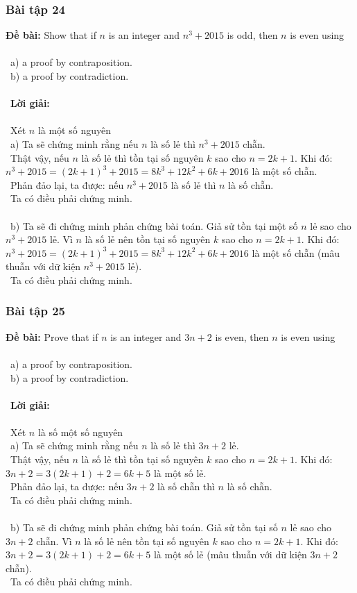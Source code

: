 \documentclass[a4paper]{article}
\begin{document}
\clearpage
\subsubsection{Bài tập 24}
\textbf{Đề bài: } Show that if $n$ is an integer and $n^3 + 2015$ is odd, then $n$ is even using \\\ \\\
a) a proof by contraposition. \\\
b) a proof by contradiction.\\\ \\\
\textbf{Lời giải:} \\\ \\\
Xét $n$ là một số nguyên \\\
a) Ta sẽ chứng minh rằng nếu $n$ là số lẻ thì $n^3 + 2015$ chẵn. \\\
Thật vậy, nếu $n$ là số lẻ thì tồn tại số nguyên $k$ sao cho $n = 2k+1$. Khi đó: $n^3+2015 = (2k+1)^3+2015=8k^3 + 12k^2+6k + 2016$ là một số chẵn.\\\
Phản đảo lại, ta được: nếu $n^3+2015$ là số lẻ thì $n$ là số chẵn. \\\
Ta có điều phải chứng minh. \\\ \\\
b) Ta sẽ đi chứng minh phản chứng bài toán. Giả sử tồn tại một số $n$ lẻ sao cho $n^3+2015$ lẻ. Vì $n$ là số lẻ nên tồn tại số nguyên $k$ sao cho $n = 2k+1$. Khi đó: $n^3+2015 = (2k+1)^3+2015=8k^3 + 12k^2+6k + 2016$ là một số chẵn (mâu thuẫn với dữ kiện $n^3 + 2015$ lẻ). \\\
Ta có điều phải chứng minh.

\clearpage
\subsubsection{Bài tập 25}
\textbf{Đề bài: } Prove that if $n$ is an integer and $3n + 2$ is even, then $n$ is even using \\\ \\\
a) a proof by contraposition. \\\
b) a proof by contradiction.\\\ \\\
\textbf{Lời giải:} \\\ \\\
Xét $n$ là số một số nguyên \\\
a) Ta sẽ chứng minh rằng nếu $n$ là số lẻ thì $3n+2$ lẻ. \\\
Thật vậy, nếu $n$ là số lẻ thì tồn tại số nguyên $k$ sao cho $n = 2k+1$. Khi đó: $3n+2 = 3(2k+1)+2 = 6k + 5$ là một số lẻ.\\\
Phản đảo lại, ta được: nếu $3n+2$ là số chẵn thì $n$ là số chẵn. \\\
Ta có điều phải chứng minh. \\\ \\\
b) Ta sẽ đi chứng minh phản chứng bài toán. Giả sử tồn tại số $n$ lẻ sao cho $3n+2$ chẵn. Vì $n$ là số lẻ nên tồn tại số nguyên $k$ sao cho $n = 2k+1$. Khi đó: $3n+2 = 3(2k+1)+2 = 6k + 5$ là một số lẻ (mâu thuẫn với dữ kiện $3n+2$ chẵn). \\\
Ta có điều phải chứng minh.
\\\ \\\
\clearpage
\end{document}
